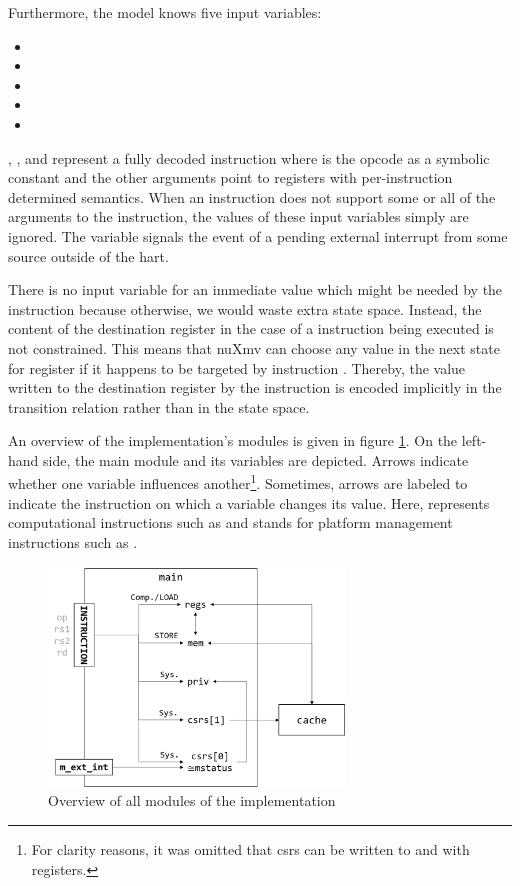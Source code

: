 Furthermore, the model knows five input variables:
\begin{itemize}
    \item {}
    \item {}
    \item {}
    \item {}
    \item {}
\end{itemize}

, ,  and  represent a fully decoded instruction where  is the opcode as a symbolic constant and the other arguments point to registers with per-instruction determined semantics.
When an instruction does not support some or all of the arguments to the instruction, the values of these input variables simply are ignored.
The variable  signals the event of a pending external interrupt from some source outside of the \gls{hart}.

There is no input variable for an immediate value which might be needed by the  instruction because otherwise, we would waste extra state space.
Instead, the content of the destination register in the case of a  instruction being executed is not constrained.
This means that nuXmv can choose any value in the next state for register  if it happens to be targeted by instruction .
Thereby, the value written to the destination register by the  instruction is encoded implicitly in the transition relation rather than in the state space.

An overview of the implementation's modules is given in figure \ref{fig:modules-overview}.
On the left-hand side, the main module and its variables are depicted.
Arrows indicate whether one variable influences another\footnote{%
    For clarity reasons, it was omitted that \glspl{csr} can be written to and with registers.
}.
Sometimes, arrows are labeled to indicate the instruction on which a variable changes its value.
Here,  represents computational instructions such as  and  stands for platform management instructions such as .

\begin{figure}
    \centering
    \includegraphics[width=0.7\textwidth]{figures/modules-overview.png}
    \caption{Overview of all modules of the implementation}
    \label{fig:modules-overview}
\end{figure}

